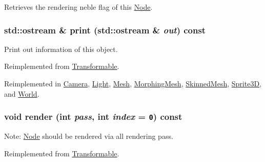 Retrieves the rendering neble flag of this \hyperlink{classm3g_1_1Node}{Node}. \hypertarget{classm3g_1_1Node_6fea17fa1532df3794f8cb39cb4f911f}{
\subsubsection[{print}]{\setlength{\rightskip}{0pt plus 5cm}std::ostream \& print (std::ostream \& {\em out}) const}}
\label{classm3g_1_1Node_6fea17fa1532df3794f8cb39cb4f911f}


Print out information of this object. 

Reimplemented from \hyperlink{classm3g_1_1Transformable_6fea17fa1532df3794f8cb39cb4f911f}{Transformable}.

Reimplemented in \hyperlink{classm3g_1_1Camera_6fea17fa1532df3794f8cb39cb4f911f}{Camera}, \hyperlink{classm3g_1_1Light_6fea17fa1532df3794f8cb39cb4f911f}{Light}, \hyperlink{classm3g_1_1Mesh_6fea17fa1532df3794f8cb39cb4f911f}{Mesh}, \hyperlink{classm3g_1_1MorphingMesh_6fea17fa1532df3794f8cb39cb4f911f}{MorphingMesh}, \hyperlink{classm3g_1_1SkinnedMesh_6fea17fa1532df3794f8cb39cb4f911f}{SkinnedMesh}, \hyperlink{classm3g_1_1Sprite3D_6fea17fa1532df3794f8cb39cb4f911f}{Sprite3D}, and \hyperlink{classm3g_1_1World_6fea17fa1532df3794f8cb39cb4f911f}{World}.\hypertarget{classm3g_1_1Node_1efcb1973989d9963d5bd6d03065d389}{
\subsubsection[{render}]{\setlength{\rightskip}{0pt plus 5cm}void render (int {\em pass}, \/  int {\em index} = {\tt 0}) const}}
\label{classm3g_1_1Node_1efcb1973989d9963d5bd6d03065d389}


Note: \hyperlink{classm3g_1_1Node}{Node} should be rendered via all rendering pass. 

Reimplemented from \hyperlink{classm3g_1_1Transformable_1efcb1973989d9963d5bd6d03065d389}{Transformable}.

